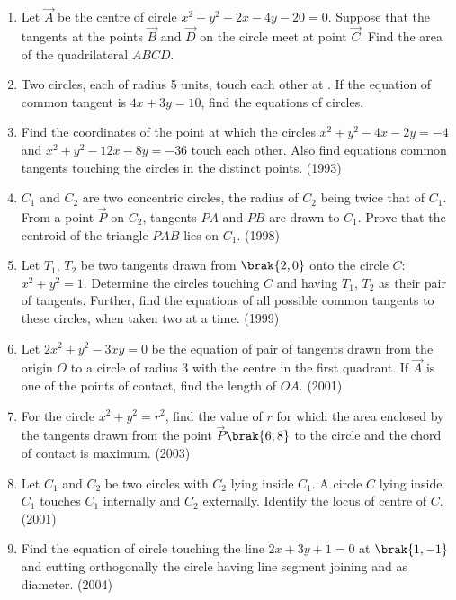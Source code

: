 \begin{enumerate}
\item Let $\vec{A}$ be the centre of circle $x^2+y^2-2x-4y-20=0$. Suppose that the tangents at the points $\vec{B}$ and $\vec{D}$ on the circle meet at point $\vec{C}$. Find the area of the quadrilateral $ABCD$.
%
\hfill {}
\item Two circles,  each of radius 5 units,  touch each other at . If the equation of common tangent is $4x+3y=10$,  find the equations of circles.
%
\hfill {}
\item Find the coordinates of the point at which the circles $x^2+y^2-4x-2y=-4$ and $x^2+y^2-12x-8y=-36$ touch each other. Also find equations common tangents touching the circles in the distinct points.                        
%
\hfill(1993)
\item $C_{1}$ and $C_{2}$ are two concentric circles,  the radius of $C_{2}$ being twice that of $C_{1}$. From a point $\vec{P}$ on $C_{2}$,  tangents $PA$ and $PB$ are drawn to $C_{1}$. Prove that the centroid of the triangle $PAB$ lies on $C_{1}$.
	           \hfill(1998)
%
%
%
%
\item Let $T_{1}$,  $T_{2}$ be two tangents drawn from $\brak{2, 0}$ onto the circle $C$:$x^2+y^2=1$. Determine the circles touching $C$ and having $T_{1}$,  $T_{2}$ as their pair of tangents. Further,  find the equations of all possible common tangents to these circles,  when taken two at a time.
                  \hfill(1999)
%
%
%
%
\item Let $2x^2+y^2-3xy=0$ be the equation of pair of tangents drawn from the origin $O$ to a circle of radius 3 with the centre in the first quadrant. If $\vec{A}$ is one of the points of contact,  find the length of $OA$.                   \hfill(2001)
%
%
%
\item For the circle $x^2+y^2=r^2$,  find the value of $r$ for which the area enclosed by the tangents drawn from the point $\vec{P}$$\brak{6, 8}$ to the circle and the chord of contact is maximum.
%
%
\hfill(2003) 
%
\item Let $C_{1}$ and $C_{2}$ be two circles with $C_{2}$ lying inside $C_{1}$. A circle $C$ lying inside $C_{1}$ touches $C_{1}$ internally and $C_{2}$ externally. Identify the locus of centre of $C$.                                \hfill(2001)
%
%
%
%
%
%
\item Find the equation of circle touching the line $2x+3y+1=0$ at $\brak{1, -1}$ and cutting orthogonally the circle having line segment joining  and  as diameter.
%
%
\hfill(2004)     
$$
\end{enumerate}
